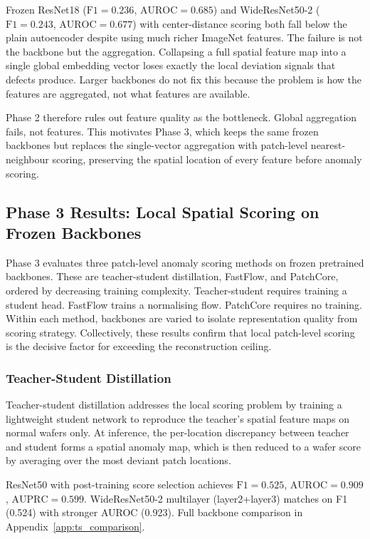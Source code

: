 \documentclass[11pt]{article}
\begin{document}
Frozen ResNet18 ($\mathrm{F1}=0.236$, $\mathrm{AUROC}=0.685$) and
WideResNet50-2 ($\mathrm{F1}=0.243$, $\mathrm{AUROC}=0.677$) with
center-distance scoring both fall below the plain autoencoder
despite using much richer ImageNet features. The failure is not the
backbone but the aggregation. Collapsing a full spatial feature map into
a single global embedding vector loses exactly the local deviation signals
that defects produce. Larger backbones do not fix this because the problem
is how the features are aggregated, not what features are available.

Phase 2 therefore rules out feature quality as the bottleneck. Global aggregation fails, not features. This motivates Phase 3,
which keeps the same frozen backbones but replaces the single-vector aggregation
with patch-level nearest-neighbour scoring, preserving the spatial location of
every feature before anomaly scoring.

\subsection{Phase 3 Results: Local Spatial Scoring on Frozen Backbones}

Phase 3 evaluates three patch-level anomaly scoring methods on frozen pretrained backbones. These are teacher-student
distillation, FastFlow, and PatchCore, ordered by decreasing training complexity.
Teacher-student requires training a student head. FastFlow trains a normalising flow. PatchCore requires no training.
Within each method, backbones are varied to isolate representation quality from scoring strategy.
Collectively, these results confirm that local patch-level scoring is the decisive factor for exceeding the reconstruction ceiling.

\subsubsection{Teacher-Student Distillation}

Teacher-student distillation addresses the local scoring problem by training
a lightweight student network to reproduce the teacher's spatial feature maps
on normal wafers only. At inference, the per-location discrepancy between
teacher and student forms a spatial anomaly map, which is then reduced to a
wafer score by averaging over the most deviant patch locations.

ResNet50 with post-training score selection achieves $\mathrm{F1}=0.525$, $\mathrm{AUROC}=0.909$, $\mathrm{AUPRC}=0.599$. WideResNet50-2 multilayer (layer2+layer3) matches on F1 (0.524) with stronger AUROC (0.923). Full backbone comparison in Appendix~\ref{app:ts_comparison}.
\end{document}
